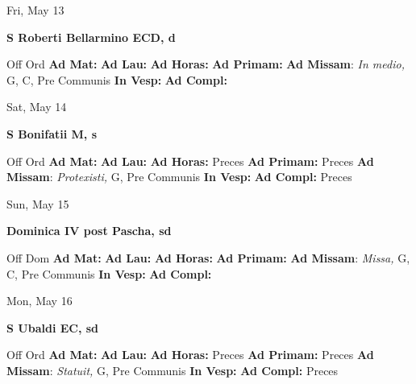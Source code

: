 \documentclass[10pt]{article}
\begin{document}
\begin{minipage}{3.5in}
\vspace{2em}\begin{center}
Fri, May 13
\end{center}\textbf{ \large S Roberti Bellarmino ECD, \textnormal{\normalsize d}}
\begin{justify}
Off Ord
\textbf{Ad Mat: }
\textbf{Ad Lau: }
\textbf{Ad Horas: }
\textbf{Ad Primam: }
\textbf{Ad Missam}: \textit{In medio,} G, C, Pre Communis
\textbf{In Vesp: }
\textbf{Ad Compl: }\end{justify}
\end{minipage}



\begin{minipage}{3.5in}
\vspace{2em}\begin{center}
Sat, May 14
\end{center}\textbf{ \large S Bonifatii M, \textnormal{\normalsize s}}
\begin{justify}
Off Ord
\textbf{Ad Mat: }
\textbf{Ad Lau: }
\textbf{Ad Horas: }Preces
\textbf{Ad Primam: }Preces
\textbf{Ad Missam}: \textit{Protexisti,} G, Pre Communis
\textbf{In Vesp: }
\textbf{Ad Compl: }Preces\end{justify}
\end{minipage}



\begin{minipage}{3.5in}
\vspace{2em}\begin{center}
Sun, May 15
\end{center}\textbf{ \large Dominica IV post Pascha, \textnormal{\normalsize sd}}
\begin{justify}
Off Dom
\textbf{Ad Mat: }
\textbf{Ad Lau: }
\textbf{Ad Horas: }
\textbf{Ad Primam: }
\textbf{Ad Missam}: \textit{Missa,} G, C, Pre Communis
\textbf{In Vesp: }
\textbf{Ad Compl: }\end{justify}
\end{minipage}



\begin{minipage}{3.5in}
\vspace{2em}\begin{center}
Mon, May 16
\end{center}\textbf{ \large S Ubaldi EC, \textnormal{\normalsize sd}}
\begin{justify}
Off Ord
\textbf{Ad Mat: }
\textbf{Ad Lau: }
\textbf{Ad Horas: }Preces
\textbf{Ad Primam: }Preces
\textbf{Ad Missam}: \textit{Statuit,} G, Pre Communis
\textbf{In Vesp: }
\textbf{Ad Compl: }Preces\end{justify}
\end{minipage}
\end{document}
